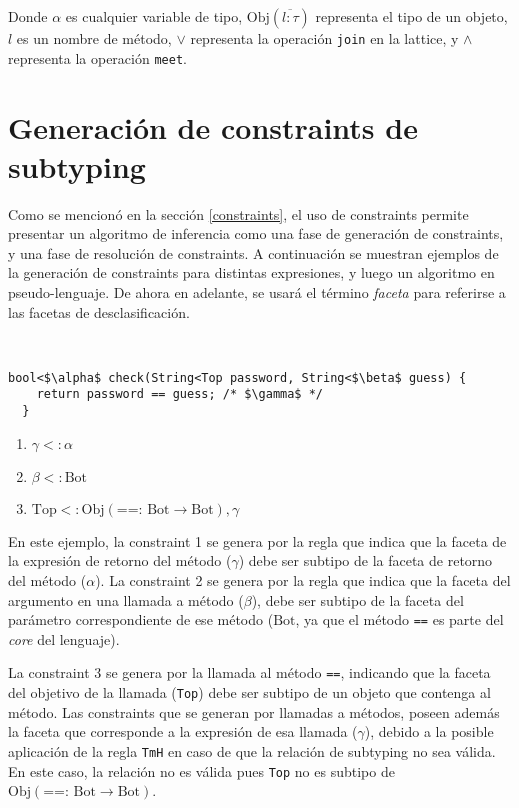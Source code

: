 Donde $\alpha$ es cualquier variable de tipo, $\text{Obj}(\overline{l: \tau})$ representa el tipo de un objeto, $l$ es un nombre de método, $\vee$ representa la operación \texttt{join} en la lattice, y $\wedge$ representa la operación \texttt{meet}.

\section{Generación de constraints de subtyping} \label{propuestaGen}
Como se mencionó en la sección \ref{constraints}, el uso de constraints permite presentar un algoritmo de inferencia como una fase de generación de constraints, y una fase de resolución de constraints. A continuación se muestran ejemplos de la generación de constraints para distintas expresiones, y luego un algoritmo en pseudo-lenguaje. De ahora en adelante, se usará el término \textit{faceta} para referirse a las facetas de desclasificación.

\begin{ej}\ \\
  \normalfont
  \label{gen1}
\begin{lstlisting}[mathescape=true]
  bool<$\alpha$ check(String<Top password, String<$\beta$ guess) {
    return password == guess; /* $\gamma$ */
  }
\end{lstlisting}

\begin{enumerate}
  \item $\gamma <: \alpha$
  \item $\beta <: \text{Bot}$
  \item $\text{Top} <: \text{Obj}(\text{==: }\text{Bot} \rightarrow \text{Bot}), \gamma$
\end{enumerate}
\end{ej}

En este ejemplo, la constraint 1 se genera por la regla que indica que la faceta de la expresión de retorno del método ($\gamma$) debe ser subtipo de la faceta de retorno del método ($\alpha$). La constraint 2 se genera por la regla que indica que la faceta del argumento en una llamada a método ($\beta$), debe ser subtipo de la faceta del parámetro correspondiente de ese método ($\text{Bot}$, ya que el método \texttt{==} es parte del \textit{core} del lenguaje).

La constraint 3 se genera por la llamada al método \texttt{==}, indicando que la faceta del objetivo de la llamada (\texttt{Top}) debe ser subtipo de un objeto que contenga al método. Las constraints que se generan por llamadas a métodos, poseen además la faceta que corresponde a la expresión de esa llamada ($\gamma$), debido a la posible aplicación de la regla \texttt{TmH} en caso de que la relación de subtyping no sea válida. En este caso, la relación no es válida pues \texttt{Top} no es subtipo de $\text{Obj}(\text{==: }\text{Bot} \rightarrow \text{Bot})$.


